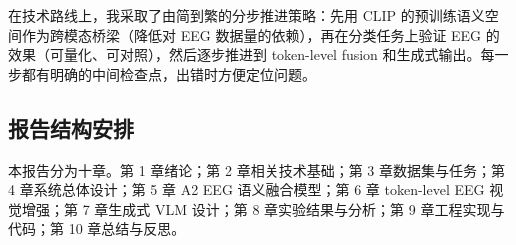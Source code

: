 在技术路线上，我采取了由简到繁的分步推进策略：先用 CLIP 的预训练语义空间作为跨模态桥梁（降低对 EEG 数据量的依赖），再在分类任务上验证 EEG 的效果（可量化、可对照），然后逐步推进到 token-level fusion 和生成式输出。每一步都有明确的中间检查点，出错时方便定位问题。

\subsection{报告结构安排}

本报告分为十章。第 1 章绪论；第 2 章相关技术基础；第 3 章数据集与任务；第 4 章系统总体设计；第 5 章 A2 EEG 语义融合模型；第 6 章 token-level EEG 视觉增强；第 7 章生成式 VLM 设计；第 8 章实验结果与分析；第 9 章工程实现与代码；第 10 章总结与反思。
